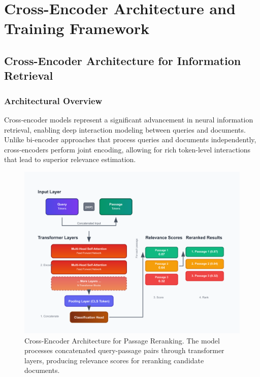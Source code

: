 
\chapter{Cross-Encoder Architecture and Training Framework} %

\label{Chapter4} %


\section{Cross-Encoder Architecture for Information Retrieval}

\subsection{Architectural Overview}

Cross-encoder models represent a significant advancement in neural information retrieval, enabling deep interaction modeling between queries and documents. Unlike bi-encoder approaches that process queries and documents independently, cross-encoders perform joint encoding, allowing for rich token-level interactions that lead to superior relevance estimation.

\begin{figure}[H]
    \centering
    \includegraphics[width=\textwidth]{Figures/cross_encoder_diagram.png}
    \captionsetup{font=footnotesize, width=0.9\linewidth}
    \caption{Cross-Encoder Architecture for Passage Reranking. The model processes concatenated query-passage pairs through transformer layers, producing relevance scores for reranking candidate documents.}
    \label{fig:cross_encoder_architecture}
\end{figure}

